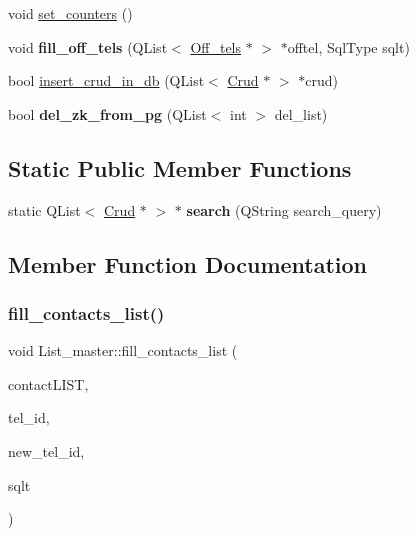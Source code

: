\begin{DoxyCompactItemize}
void \mbox{\hyperlink{class_list__master_af654639e0d014ff93c6dfd1f6a6d44c4}{set\+\_\+counters}} ()
\item 
\mbox{\label{class_list__master_a0512c666c91ccd49f5c9e707cd3edbd3}} 
void {\bfseries fill\+\_\+off\+\_\+tels} (Q\+List$<$ \mbox{\hyperlink{class_off__tels}{Off\+\_\+tels}} $\ast$ $>$ $\ast$offtel, Sql\+Type sqlt)
\item 
bool \mbox{\hyperlink{class_list__master_a86f1c83211c6f95e78662a17adf3696b}{insert\+\_\+crud\+\_\+in\+\_\+db}} (Q\+List$<$ \mbox{\hyperlink{class_crud}{Crud}} $\ast$ $>$ $\ast$crud)
\item 
\mbox{\label{class_list__master_a963fa71a0662594de9aeaa0e0b6cbf7f}} 
bool {\bfseries del\+\_\+zk\+\_\+from\+\_\+pg} (Q\+List$<$ int $>$ del\+\_\+list)
\end{DoxyCompactItemize}
\subsection*{Static Public Member Functions}
\begin{DoxyCompactItemize}
\item 
\mbox{\label{class_list__master_af87c232aba5187945dbc49ce5ac0f177}} 
static Q\+List$<$ \mbox{\hyperlink{class_crud}{Crud}} $\ast$ $>$ $\ast$ {\bfseries search} (Q\+String search\+\_\+query)
\end{DoxyCompactItemize}


\subsection{Member Function Documentation}
\mbox{\label{class_list__master_aa22bf9a416c88c5e3abb803a43392c1b}} 
\subsubsection{\texorpdfstring{fill\_contacts\_list()}{fill\_contacts\_list()}}
{\footnotesize\ttfamily void List\+\_\+master\+::fill\+\_\+contacts\+\_\+list (\begin{DoxyParamCaption}\item[{Q\+List$<$ \mbox{\hyperlink{class_contacts}{Contacts}} $\ast$ $>$ $\ast$}]{contact\+L\+I\+ST,  }\item[{int}]{tel\+\_\+id,  }\item[{int}]{new\+\_\+tel\+\_\+id,  }\item[{Sql\+Type}]{sqlt }\end{DoxyParamCaption})}

